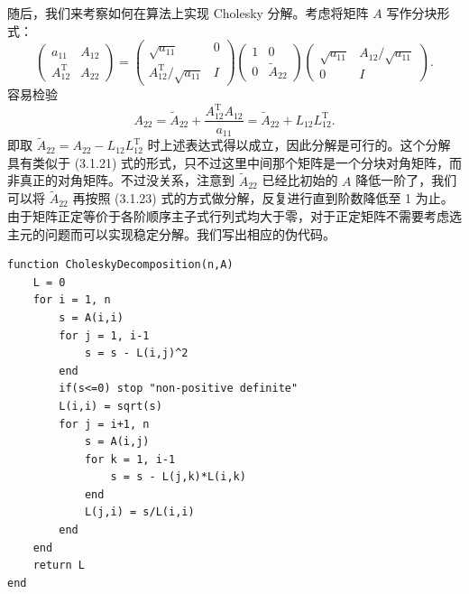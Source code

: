 随后，我们来考察如何在算法上实现 Cholesky 分解。考虑将矩阵 $A$ 写作分块形式：
\begin{equation}
\begin{pmatrix}
a_{11}&A_{12}\\A_{12}^{\mathrm T}&A_{22}
\end{pmatrix}
=
\begin{pmatrix}
\sqrt{a_{11}}&0\\A_{12}^{\mathrm T}/\sqrt{a_{11}}&I
\end{pmatrix}
\begin{pmatrix}1&0\\0&\widetilde A_{22}\end{pmatrix}
\begin{pmatrix}
\sqrt{a_{11}}&A_{12}/\sqrt{a_{11}}\\0&I
\end{pmatrix}.
\tag{3.1.23}
\end{equation}
容易检验
\begin{equation}
A_{22}=\widetilde A_{22}+\frac{A_{12}^{\mathrm T}A_{12}}{a_{11}}
=\widetilde A_{22}+L_{12}L_{12}^{\mathrm T}.
\tag{3.1.24}
\end{equation}
即取 $\widetilde A_{22}=A_{22}-L_{12}L_{12}^{\mathrm T}$ 时上述表达式得以成立，因此分解是可行的。这个分解具有类似于 (3.1.21) 式的形式，只不过这里中间那个矩阵是一个分块对角矩阵，而非真正的对角矩阵。不过没关系，注意到 $\widetilde A_{22}$ 已经比初始的 $A$ 降低一阶了，我们可以将 $\widetilde A_{22}$ 再按照 (3.1.23) 式的方式做分解，反复进行直到阶数降低至 1 为止。由于矩阵正定等价于各阶顺序主子式行列式均大于零，对于正定矩阵不需要考虑选主元的问题而可以实现稳定分解。我们写出相应的伪代码。

\begin{algorithmBox}
\begin{lstlisting}[style=bellacode]
function CholeskyDecomposition(n,A)
    L = 0
    for i = 1, n
        s = A(i,i)
        for j = 1, i-1
            s = s - L(i,j)^2
        end
        if(s<=0) stop "non-positive definite"
        L(i,i) = sqrt(s)
        for j = i+1, n
            s = A(i,j)
            for k = 1, i-1
                s = s - L(j,k)*L(i,k)
            end
            L(j,i) = s/L(i,i)
        end
    end
    return L
end
\end{lstlisting}
\end{algorithmBox}

